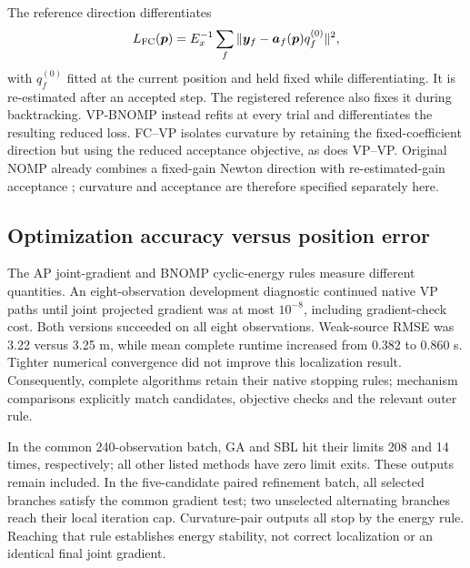 \documentclass[a4paper,12pt,review]{cas-sc}
\begin{document}
The reference direction differentiates
\begin{equation}
L_{\rm FC}(\bm p)=E_x^{-1}\sum_f
 \|\bm y_f-\bm a_f(\bm p)q_f^{(0)}\|^2,
\end{equation}
with $q_f^{(0)}$ fitted at the current position and held fixed while differentiating. It is re-estimated after an accepted step. The registered reference also fixes it during backtracking. VP-BNOMP instead refits at every trial and differentiates the resulting reduced loss. FC--VP isolates curvature by retaining the fixed-coefficient direction but using the reduced acceptance objective, as does VP--VP. Original NOMP already combines a fixed-gain Newton direction with re-estimated-gain acceptance \cite{Mamandipoor2016}; curvature and acceptance are therefore specified separately here.

\subsection{Optimization accuracy versus position error}
The AP joint-gradient and BNOMP cyclic-energy rules measure different quantities. An eight-observation development diagnostic continued native VP paths until joint projected gradient was at most $10^{-8}$, including gradient-check cost. Both versions succeeded on all eight observations. Weak-source RMSE was 3.22 versus 3.25 m, while mean complete runtime increased from 0.382 to 0.860 s. Tighter numerical convergence did not improve this localization result. Consequently, complete algorithms retain their native stopping rules; mechanism comparisons explicitly match candidates, objective checks and the relevant outer rule.

In the common 240-observation batch, GA and SBL hit their limits 208 and 14 times, respectively; all other listed methods have zero limit exits. These outputs remain included. In the five-candidate paired refinement batch, all selected branches satisfy the common gradient test; two unselected alternating branches reach their local iteration cap. Curvature-pair outputs all stop by the energy rule. Reaching that rule establishes energy stability, not correct localization or an identical final joint gradient.
\end{document}
